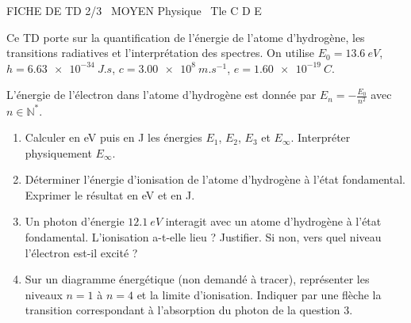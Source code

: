 \documentclass[11pt]{article}
\begin{document}
\begin{tcolorbox}[enhanced,colback=popink,colframe=popink,arc=10pt,boxrule=0pt,left=12pt,right=12pt,top=9pt,bottom=9pt]
{\color{white}\popxbold\small FICHE DE TD 2/3 \textbullet\ MOYEN \hfill Physique \textbullet\ Tle C D E\par}
\end{tcolorbox}
\vspace{4pt}
Ce TD porte sur la quantification de l'énergie de l'atome d'hydrogène, les transitions radiatives et l'interprétation des spectres. On utilise $E_0 = \SI{13,6}{eV}$, $h = \SI{6,63e-34}{J.s}$, $c = \SI{3,00e8}{m.s^{-1}}$, $e = \SI{1,60e-19}{C}$.

\begin{exercice}
L'énergie de l'électron dans l'atome d'hydrogène est donnée par $E_n = -\frac{E_0}{n^2}$ avec $n \in \mathbb{N}^*$.
\begin{enumerate}
    \item Calculer en \si{eV} puis en \si{J} les énergies $E_1$, $E_2$, $E_3$ et $E_\infty$. Interpréter physiquement $E_\infty$.
    \item Déterminer l'énergie d'ionisation de l'atome d'hydrogène à l'état fondamental. Exprimer le résultat en \si{eV} et en \si{J}.
    \item Un photon d'énergie $\SI{12,1}{eV}$ interagit avec un atome d'hydrogène à l'état fondamental. L'ionisation a-t-elle lieu ? Justifier. Si non, vers quel niveau l'électron est-il excité ?
    \item Sur un diagramme énergétique (non demandé à tracer), représenter les niveaux $n=1$ à $n=4$ et la limite d'ionisation. Indiquer par une flèche la transition correspondant à l'absorption du photon de la question 3.
\end{enumerate}
\end{exercice}
\end{document}
